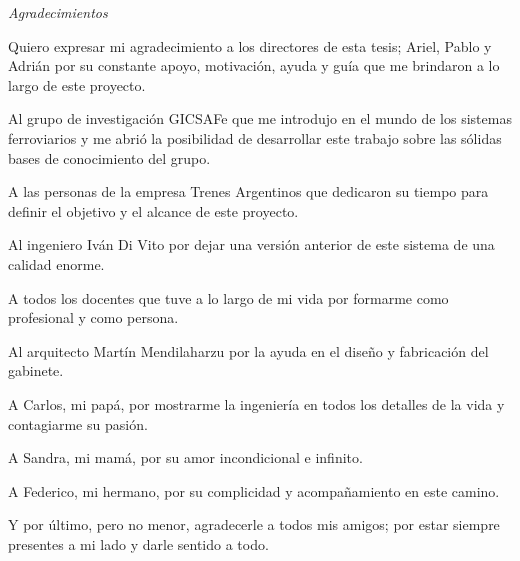 
\vspace*{\fill}

\begin{center}

{\huge \textit{Agradecimientos}}


\vspace{1.3cm}

\begin{adjustwidth}{2cm}{2cm}
\begin{center}
        
Quiero expresar mi agradecimiento a los directores de esta tesis; Ariel, Pablo y Adrián por su constante apoyo, motivación, ayuda y guía que me brindaron a lo largo de este proyecto. \\ 
\vspace{.7cm}

Al grupo de investigación GICSAFe que me introdujo en el mundo de los sistemas ferroviarios y me abrió la posibilidad de desarrollar este trabajo sobre las sólidas bases de conocimiento del grupo.

\vspace{.7cm}

A las personas de la empresa Trenes Argentinos que dedicaron su tiempo para definir el objetivo y el alcance de este proyecto. 

\vspace{.7cm}

Al ingeniero Iván Di Vito por dejar una versión anterior de este sistema de una calidad enorme.

\vspace{.7cm}

A todos los docentes que tuve a lo largo de mi vida por formarme como profesional y como persona. 

\vspace{.7cm}

Al arquitecto Martín Mendilaharzu por la ayuda en el diseño y fabricación del gabinete. 

\vspace{.7cm}

A Carlos, mi papá, por mostrarme la ingeniería en todos los detalles de la vida y contagiarme su pasión.

\vspace{.7cm}

A Sandra, mi mamá, por su amor incondicional e infinito.

\vspace{.7cm}

A Federico, mi hermano, por su complicidad y acompañamiento en este camino.

\vspace{.7cm}

Y por último, pero no menor, agradecerle a todos mis amigos; por estar siempre presentes a mi lado y darle sentido a todo. 

\end{center}
\end{adjustwidth}

\end{center}

\vspace{2.8cm}

\vspace*{\fill}

